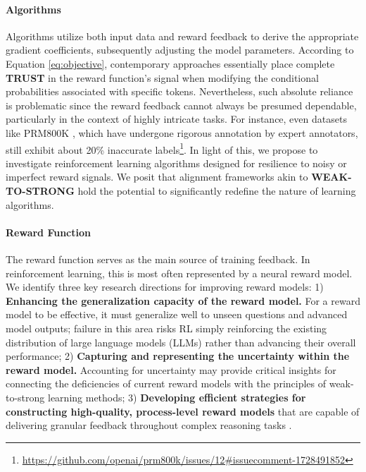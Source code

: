 \begin{itemize}[topsep=0pt]
\begin{itemize}[topsep=0pt]
\paragraph{Algorithms} Algorithms utilize both input data and reward feedback to derive the appropriate gradient coefficients, subsequently adjusting the model parameters. According to Equation \ref{eq:objective}, contemporary approaches essentially place complete \textbf{TRUST} in the reward function’s signal when modifying the conditional probabilities associated with specific tokens. Nevertheless, such absolute reliance is problematic since the reward feedback cannot always be presumed dependable, particularly in the context of highly intricate tasks. For instance, even datasets like PRM800K \citep{lightman2023let}, which have undergone rigorous annotation by expert annotators, still exhibit about 20\% inaccurate labels\footnote{\url{https://github.com/openai/prm800k/issues/12\#issuecomment-1728491852}}. In light of this, we propose to investigate reinforcement learning algorithms designed for resilience to noisy or imperfect reward signals. We posit that alignment frameworks akin to \textbf{WEAK-TO-STRONG} \citep{burns2023weak} hold the potential to significantly redefine the nature of learning algorithms.

\paragraph{Reward Function} The reward function serves as the main source of training feedback. In reinforcement learning, this is most often represented by a neural reward model. We identify three key research directions for improving reward models: 1) \textbf{Enhancing the generalization capacity of the reward model.} For a reward model to be effective, it must generalize well to unseen questions and advanced model outputs; failure in this area risks RL simply reinforcing the existing distribution of large language models (LLMs) rather than advancing their overall performance; 2) \textbf{Capturing and representing the uncertainty within the reward model.} Accounting for uncertainty may provide critical insights for connecting the deficiencies of current reward models with the principles of weak-to-strong learning methods; 3) \textbf{Developing efficient strategies for constructing high-quality, process-level reward models} that are capable of delivering granular feedback throughout complex reasoning tasks \citep{lightman2023let,wang2023math}.


\end{itemize}
\end{itemize}
